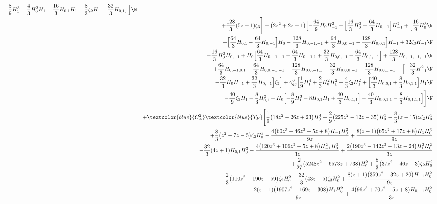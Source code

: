 \begin{eqnarray}
-\frac{8}{9} H_1^3
-\frac{4}{3} H_0^2 H_1
+\frac{16}{3} H_{0,1} H_1
-\frac{8}{3} \zeta_2 H_1
-\frac{32}{3} H_{0,1,1}\Bigr]
\N\\&&
+\frac{128}{3} (5 z+1) \zeta_3\Biggr]
+\big(2 z^2+2 z+1\big) \Bigl[
-\frac{64}{9} H_0 H_{-1}^3+\Bigl[
\frac{16}{3} H_0^2
+\frac{64}{3} H_{0,-1}\Bigr] H_{-1}^2+\Bigl[
\frac{16}{9} H_0^3
\N\\&&
+\Bigl[
\frac{64}{3} H_{0,1}
-\frac{64}{3} H_{0,-1}\Bigr] H_0
-\frac{128}{3} H_{0,-1,-1}
+\frac{64}{3} H_{0,0,-1}
-\frac{128}{3} H_{0,0,1}\Bigr] H_{-1}+32 \zeta_3 H_{-1}
\N\\&&
-\frac{16}{3} H_0^2 H_{0,-1}+H_0 \Bigl[
\frac{64}{3} H_{0,-1,-1}
-\frac{64}{3} H_{0,-1,1}
+\frac{32}{3} H_{0,0,-1}
-\frac{64}{3} H_{0,1,-1}\Bigr]
+\frac{128}{3} H_{0,-1,-1,-1}
\N\\&&
+\frac{64}{3} H_{0,-1,0,1}
-\frac{64}{3} H_{0,0,-1,-1}
+\frac{128}{3} H_{0,0,-1,1}
-\frac{32}{3} H_{0,0,0,-1}
+\frac{128}{3} H_{0,0,1,-1}+\Bigl[
-\frac{32}{3} H_{-1}^2
\N\\&&
-\frac{32}{3} H_0 H_{-1}
+\frac{32}{3} H_{0,-1}\Bigr] \zeta_2\Bigr]
+{\gamma}_{qg}^{0} \Bigl[
\frac{1}{9} H_1^4
+\frac{2}{3} H_0^2 H_1^2
+\frac{4}{3} \zeta_2 H_1^2+\Bigl[
\frac{40}{3} H_{0,0,1}
+\frac{8}{3} H_{0,1,1}\Bigr] H_1
\N\\&&
-\frac{40}{9} \zeta_3 H_1
-\frac{8}{3} H_{0,1}^2
+H_0 \Bigl[
-\frac{8}{9} H_1^3-8 H_{0,1} H_1
+\frac{40}{3} H_{0,1,1}\Bigr]
-\frac{40}{3} H_{0,0,1,1}
-\frac{8}{3} H_{0,1,1,1}\Bigr]\Biggr]
\N\\&&
%
+\textcolor{blue}{C_A^2}  \textcolor{blue}{T_F}
\Biggl[\frac{1}{9} \big(18 z^2-26z+23\big) H_0^4+\frac{2}{9} \big(225 z^2-12 z-35\big) H_0^3-\frac{8}{3} (z-15) z \zeta_2 H_0^3
\nonumber \\ &&
+\frac{8}{3} \big(z^2-7 z-5\big) \zeta_2H_0^3-\frac{4 \big(60 z^3+46 z^2+5 z+8\big) H_{-1} H_0^3}{9 z}+\frac{8 (z-1)  \big(65 z^2+17 z+8\big) H_1 H_0^3}{9 z}
\nonumber \\ &&
-\frac{32}{3} (4 z+1) H_{0,1}H_0^3-\frac{4 \big(120 z^3+106 z^2+5 z+8\big) H_{-1}^2 H_0^2}{3 z}
+\frac{2  \big(190 z^3-142 z^2-13 z-24\big) H_1^2 H_0^2}{3 z}
\nonumber \\ &&
+\frac{2}{27} \big(5248z^2-6573 z+738\big) H_0^2+\frac{8}{3}  \big(37 z^2+46 z-3\big)\zeta_2 H_0^2
\nonumber \\ &&
-\frac{2}{3} \big(110 z^2+190 z-59\big) \zeta_2H_0^2-\frac{32}{3} (43 z-5) \zeta_3 H_0^2+\frac{8 (z+1) \big(359 z^2-32  z+20\big) H_{-1} H_0^2}{9 z}
\nonumber \\ &&
+\frac{2 (z-1) \big(1907 z^2-169 z+308\big) H_1  H_0^2}{9 z}+\frac{4 \big(96 z^3+70 z^2+5 z+8\big) H_{0,-1} H_0^2}{3  z}

\end{eqnarray}

